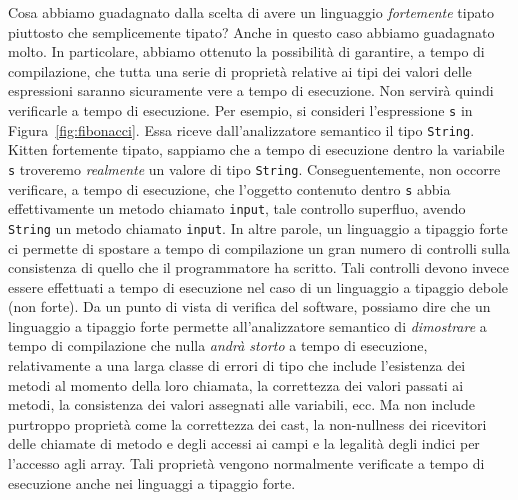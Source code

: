 Cosa abbiamo guadagnato dalla scelta di avere un linguaggio
\emph{fortemente} tipato piuttosto che semplicemente tipato? Anche in questo
caso abbiamo guadagnato molto. In particolare, abbiamo ottenuto la
possibilit\`a di garantire, a tempo di compilazione, che tutta una serie
di propriet\`a relative ai tipi dei valori delle espressioni saranno
sicuramente vere a tempo di esecuzione. Non servir\`a quindi verificarle
a tempo di esecuzione. Per esempio, si consideri l'espressione
\texttt{s} in Figura~\ref{fig:fibonacci}. Essa riceve dall'analizzatore
semantico il tipo \texttt{String}. \Poiche Kitten \e fortemente tipato,
sappiamo che a tempo di esecuzione dentro la variabile \texttt{s} troveremo
\emph{realmente}
un valore di tipo \texttt{String}. Conseguentemente, non occorre verificare,
a tempo di esecuzione, che l'oggetto contenuto dentro \texttt{s} abbia
effettivamente un metodo chiamato \texttt{input}, \perche tale controllo
\e superfluo, avendo \texttt{String} un metodo chiamato \texttt{input}.
In altre parole, un linguaggio a tipaggio forte ci permette di spostare
a tempo di compilazione un gran numero di controlli sulla consistenza
di quello che il programmatore ha scritto. Tali controlli devono invece
essere effettuati a tempo di esecuzione nel caso di un linguaggio a
tipaggio debole (\cioe non forte). Da un punto di vista di verifica del
software, possiamo dire che un linguaggio a tipaggio forte permette
all'analizzatore semantico di \emph{dimostrare} a tempo di compilazione
che nulla \emph{andr\`a storto}
a tempo di esecuzione, relativamente a una larga
classe di errori di tipo che include l'esistenza dei metodi al momento
della loro chiamata, la correttezza dei valori passati ai metodi,
la consistenza dei valori assegnati alle variabili, ecc. Ma non include
purtroppo
propriet\`a come la correttezza dei cast, la non-nullness dei ricevitori
delle chiamate di metodo e degli accessi ai campi e la legalit\`a
degli indici per l'accesso agli array. Tali propriet\`a
vengono normalmente verificate a tempo di esecuzione anche nei linguaggi
a tipaggio forte.

